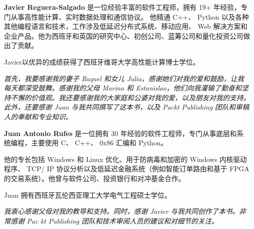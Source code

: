 \textbf{Javier Reguera-Salgado }是一位经验丰富的软件工程师，拥有 19+ 年经验，专门从事高性能计算、实时数据处理和通信协议。
他精通 C++、 Python 以及各种其他编程语言和技术，工作涉及低延迟分布式系统、移动应用、 Web 解决方案和企业产品。他为西班牙和英国的研究中心、初创公司、蓝筹公司和量化投资公司做出了贡献。

Javier以优异的成绩获得了西班牙维哥大学高性能计算博士学位。

\hspace*{\fill}

\textit{
首先，我要感谢我的妻子 Raquel 和女儿 Julia，感谢她们对我的爱和鼓励，让我每天都深受鼓舞。感谢我的父母 Marina 和 Estanislao，他们向我灌输了勤奋和坚持不懈的价值观。我还要感谢我的大家庭和公婆对我的爱，以及朋友对我的支持。此外，还要感谢 Juan 与我共同撰写了这本书，以及 Packt Publishing 团队和审稿人的奉献和专业知识。
}

\hspace*{\fill}

\textbf{Juan Antonio Rufes} 是一位拥有 30 年经验的软件工程师，专门从事底层和系统编程，主要使用 C、 C++、 0x86 汇编和 Python。

他的专长包括 Windows 和 Linux 优化、用于防病毒和加密的 Windows 内核驱动程序、 TCP/ IP 协议分析以及低延迟金融系统（例如智能订单路由和基于 FPGA 的交易系统）。他曾与软件公司、投资银行和对冲基金合作。

Juan 拥有西班牙瓦伦西亚理工大学电气工程硕士学位。

\hspace*{\fill}

\textit{
我衷心感谢父母对我的教导和支持。同时，感谢 Javier 与我共同创作了本书。非常感谢 Pac kt Publishing 团队和技术审阅人员的建议和对细节的关注。
}